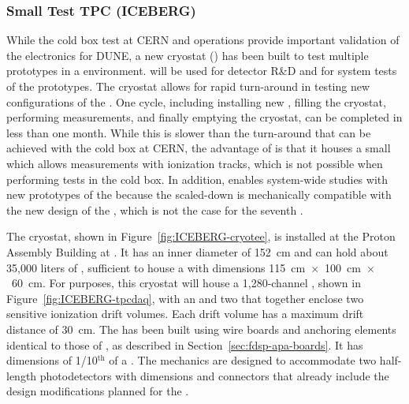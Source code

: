 \subsubsection{Small Test TPC (ICEBERG)}
\label{sec:fdsp-tpcelec-qa-facilities-testtpc}

While the cold box test at CERN and  operations provide important 
validation of the  electronics for DUNE, a new cryostat () 
has been built to test multiple  prototypes in a  environment.
 will be used for 
 detector R\&D and for system tests of the  prototypes. 
The  cryostat allows for rapid turn-around in testing new configurations
of the . One cycle, including installing new , filling the cryostat,
performing measurements, and finally emptying the cryostat, can be completed in less than
one month. While this is slower than the turn-around that can be achieved with the
cold box at CERN, the advantage of  is that it houses a small  which
allows measurements with ionization tracks, which is not possible when performing
tests in the cold box. In addition,  enables system-wide studies with new
prototypes of the  because the scaled-down  is mechanically compatible with the 
new design of the , which is not the case for the seventh  .  

The  cryostat, shown in Figure~\ref{fig:ICEBERG-cryotee}, is installed
at the Proton Assembly Building at . It has an inner diameter of \SI{152}{cm}
and can hold about 35,000 liters of , sufficient to house a
 with dimensions \SI{115}{cm}~$\times$~\SI{100}{cm}~$\times$~\SI{60}{cm}. For
 purposes, this cryostat will house a 1,280-channel , shown in
Figure~\ref{fig:ICEBERG-tpcdaq}, with an  and two  that
together enclose two sensitive ionization drift volumes. Each drift volume has 
a maximum drift distance of \SI{30}{cm}. The  
has been built using wire boards and anchoring elements identical to
those of , as 
described in Section~\ref{sec:fdsp-apa-boards}. It has dimensions of 
1/10$^{\mathrm{th}}$ of a  . The  mechanics are designed to
accommodate two half-length  photodetectors with dimensions and connectors that already 
include the design modifications planned for the  .

